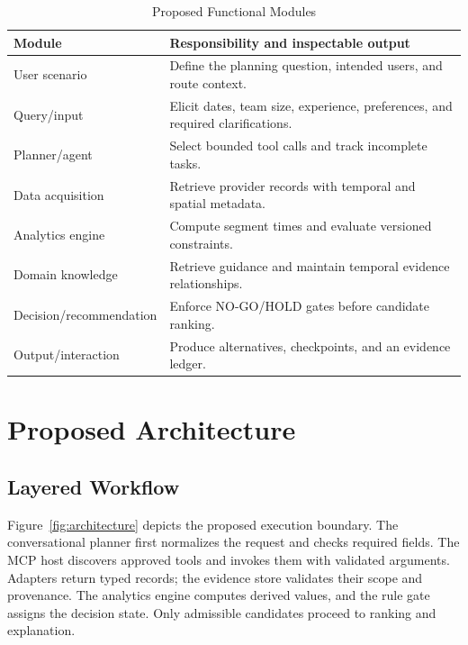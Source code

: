 \documentclass[conference]{IEEEtran}
\begin{document}
\begin{table}[t]
\caption{Proposed Functional Modules}
\label{tab:modules}
\centering\footnotesize
\begin{tabular}{@{}p{}p{}@{}}
\toprule
Module & Responsibility and inspectable output\\
\midrule
User scenario & Define the planning question, intended users, and route context.\\
Query/input & Elicit dates, team size, experience, preferences, and required clarifications.\\
Planner/agent & Select bounded tool calls and track incomplete tasks.\\
Data acquisition & Retrieve provider records with temporal and spatial metadata.\\
Analytics engine & Compute segment times and evaluate versioned constraints.\\
Domain knowledge & Retrieve guidance and maintain temporal evidence relationships.\\
Decision/recommendation & Enforce NO-GO/HOLD gates before candidate ranking.\\
Output/interaction & Produce alternatives, checkpoints, and an evidence ledger.\\
\bottomrule
\end{tabular}
\end{table}

\section{Proposed Architecture}
\subsection{Layered Workflow}
Figure~\ref{fig:architecture} depicts the proposed execution boundary. The conversational planner first normalizes the request and checks required fields. The MCP host discovers approved tools and invokes them with validated arguments. Adapters return typed records; the evidence store validates their scope and provenance. The analytics engine computes derived values, and the rule gate assigns the decision state. Only admissible candidates proceed to ranking and explanation.
\end{document}
